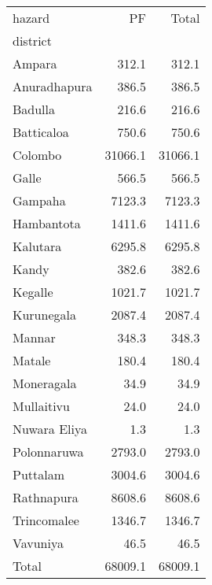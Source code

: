 \begin{tabular}{lrr}
\toprule
hazard &       PF &    Total \\
district     &          &          \\
\midrule
Ampara       &    312.1 &    312.1 \\
Anuradhapura &    386.5 &    386.5 \\
Badulla      &    216.6 &    216.6 \\
Batticaloa   &    750.6 &    750.6 \\
Colombo      &  31066.1 &  31066.1 \\
Galle        &    566.5 &    566.5 \\
Gampaha      &   7123.3 &   7123.3 \\
Hambantota   &   1411.6 &   1411.6 \\
Kalutara     &   6295.8 &   6295.8 \\
Kandy        &    382.6 &    382.6 \\
Kegalle      &   1021.7 &   1021.7 \\
Kurunegala   &   2087.4 &   2087.4 \\
Mannar       &    348.3 &    348.3 \\
Matale       &    180.4 &    180.4 \\
Moneragala   &     34.9 &     34.9 \\
Mullaitivu   &     24.0 &     24.0 \\
Nuwara Eliya &      1.3 &      1.3 \\
Polonnaruwa  &   2793.0 &   2793.0 \\
Puttalam     &   3004.6 &   3004.6 \\
Rathnapura   &   8608.6 &   8608.6 \\
Trincomalee  &   1346.7 &   1346.7 \\
Vavuniya     &     46.5 &     46.5 \\
Total        &  68009.1 &  68009.1 \\
\bottomrule
\end{tabular}
